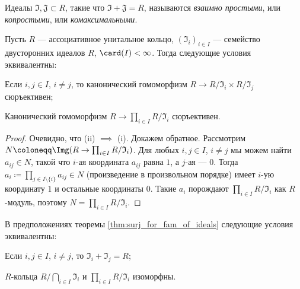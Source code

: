 \documentclass[
	extrafontsizes,
	11pt,
	hyphens,
]{memoir}
\begin{document}
\begin{remark}
Идеалы \(\mathfrak{I}, \mathfrak{J} \subset R\), такие что \(\mathfrak{I} + \mathfrak{J} = R\), называются \emph{взаимно простыми}, или \emph{копростыми}, или \emph{комаксимальными}.
\end{remark}

\begin{theorem}
Пусть $R$ --- ассоциативное унитальное кольцо,
$(\mathfrak{I}_i)_{i \in I}$ --- семейство двусторонних идеалов $R$,
$\card(I) < \infty$.
Тогда следующие условия эквивалентны:
\begin{enumerate*}[label={\textup{(\roman*)}}]
	\item
	Если $i,j \in I$, $i \neq j$, то канонический гомоморфизм $R \to R/\mathfrak{I}_i \times R/\mathfrak{I}_j$ сюръективен;
	\item Канонический гомоморфизм $R \to \prod_{i \in I} R/\mathfrak{I}_i$ сюръективен.
\end{enumerate*}
\label{thm:surj_for_fam_of_ideals}
\end{theorem}

\begin{proof}
Очевидно, что (ii) $\implies$ (i).
Докажем обратное.
Рассмотрим $N \coloneqq \Img(R \to \prod_{i \in I} R/\mathfrak{I}_i)$. Для любых $i,j \in I$, $i \neq j$ мы можем найти $a_{ij} \in N$, такой что $i$-ая координата $a_{ij}$ равна $1$, а $j$-ая --- $0$. Тогда $a_i \coloneqq \prod_{j \in I \setminus \{i\}} a_{ij} \in N$ (произведение в произвольном порядке) имеет $i$-ую координату $1$ и остальные координаты $0$. Такие $a_i$ порождают $\prod_{i \in I} R/\mathfrak{I}_i$ как $R$-модуль, поэтому $N = \prod_{i \in I} R/\mathfrak{I}_i$.
\end{proof}

\begin{corollary}
В предположениях теоремы \ref{thm:surj_for_fam_of_ideals} следующие условия эквивалентны:
\begin{enumerate*}[label={\textup{(\roman*)}}]
    \item Если $i,j \in I$, $i \neq j$, то $\mathfrak{I}_i + \mathfrak{I}_j = R$;
    \item
	\(R\)-кольца \(R / \bigcap_{i \in I} \mathfrak{I}_i \) и \(\prod_{i \in I} R / \mathfrak{I}_i\) изоморфны.
\end{enumerate*}
\end{corollary}
\end{document}

